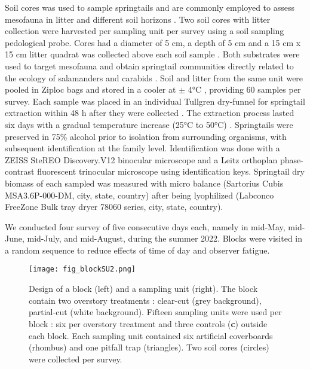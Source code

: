 Soil cores was used to sample springtails and are commonly employed to assess mesofauna in litter and different soil horizons \citep{chauvatChangesSoilFaunal2011a,farskaManagementIntensityAffects2014,pongeVerticalDistributionCollembola2000,salamonEffectsPlantDiversity2004,wuCompositionSpatiotemporalVariation2014}. 
Two soil cores with litter collection were harvested per sampling unit per survey using a soil sampling pedological probe. 
Cores had a diameter of 5 cm, a depth of 5 cm and a 15 cm x 15 cm litter quadrat was collected above each soil sample \citep{raymond-leonardSpringtailCommunityStructure2018a,rousseauForestFloorMesofauna2018}.
Both substrates were used to target mesofauna and obtain springtail communities directly related to the ecology of salamanders and carabids \citep{chauvatChangesSoilFaunal2011a,edwardsAssessmentPopulationsSoilinhabiting1991,raymond-leonardSpringtailCommunityStructure2018a,rousseauForestFloorMesofauna2018}.
Soil and litter from the same unit were pooled in Ziploc\up{\texttrademark{}} bags and stored in a cooler at $\pm$ 4°C \citep{chauvatChangesSoilFaunal2011a,rousseauForestFloorMesofauna2018}, providing 60 samples per survey.
Each sample was placed in an individual Tullgren dry-funnel for springtail extraction within 48 h after they were collected \citep{rousseauForestFloorMesofauna2018,rusekBiodiversityCollembolaTheir1998,wuCompositionSpatiotemporalVariation2014}. 
The extraction process lasted six days with a gradual temperature increase (25°C to 50°C) \citep{raymond-leonardSpringtailCommunityStructure2018a}.
Springtails were preserved in 75\% alcohol \citep{wuCompositionSpatiotemporalVariation2014} prior to isolation from surrounding organisms, with subsequent identification at the family level.
Identification was done with a ZEISS SteREO Discovery.V12 binocular microscope and a Leitz orthoplan phase-contrast fluorescent trinocular microscope using \cite{bellingerChecklistCollembolaWorld1996} identification keys.
Springtail dry biomass of each sampled was measured with micro balance (Sartorius Cubis\up{\texttrademark{}} MSA3.6P-000-DM, city, state, country) after being lyophilized (Labconco FreeZone Bulk tray dryer 78060 series, city, state, country).

We conducted four survey of five consecutive days each, namely in mid-May, mid-June, mid-July, and mid-August, during the summer 2022.
Blocks were visited in a random sequence to reduce effects of time of day and observer fatigue.

\pagebreak

\begin{figure}[ht]
	\centering
	\texttt{[image: fig\_blockSU2.png]}
	\caption[Design of one block and one sampling unit with three sampling methods.]{
  Design of a block (left) and a sampling unit (right). 
  The block contain two overstory treatments : clear-cut (grey background), partial-cut (white background). 
  Fifteen sampling units were used per block : six per overstory treatment and three controls (\textbf{c}) outside each block.
  Each sampling unit contained six artificial coverboards (rhombus) and one pitfall trap (triangles). Two soil cores (circles) were collected per survey.
  }
	\label{fig:blockSU}
	\end{figure}  

